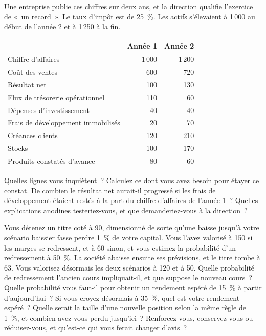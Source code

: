 \begin{question}\label{iq:iv2:valuation-and-financial-statements:24}
Une entreprise publie ces chiffres sur deux ans, et la direction qualifie l'exercice de «~un record~». Le taux d'impôt est de 25~\%. Les actifs s'élevaient à 1\,000 au début de l'année 2 et à 1\,250 à la fin.
\begin{center}\small
\begin{tabular}{@{}lrr@{}}
 & Année 1 & Année 2 \\ \hline
Chiffre d'affaires & 1\,000 & 1\,200 \\
Coût des ventes & 600 & 720 \\
Résultat net & 100 & 130 \\
Flux de trésorerie opérationnel & 110 & 60 \\
Dépenses d'investissement & 40 & 40 \\
Frais de développement immobilisés & 20 & 70 \\
Créances clients & 120 & 210 \\
Stocks & 100 & 170 \\
Produits constatés d'avance & 80 & 60
\end{tabular}
\end{center}
Quelles lignes vous inquiètent~? Calculez ce dont vous avez besoin pour étayer ce constat. De combien le résultat net aurait-il progressé si les frais de développement étaient restés à la part du chiffre d'affaires de l'année 1~? Quelles explications anodines testeriez-vous, et que demanderiez-vous à la direction~?
\end{question}

\begin{question}\label{iq:iv2:valuation-and-financial-statements:25}
Vous détenez un titre coté à 90, dimensionné de sorte qu'une baisse jusqu'à votre scénario baissier fasse perdre 1~\% de votre capital. Vous l'avez valorisé à 150 si les marges se redressent, et à 60 sinon, et vous estimez la probabilité d'un redressement à 50~\%. La société abaisse ensuite ses prévisions, et le titre tombe à 63. Vous valorisez désormais les deux scénarios à 120 et à 50. Quelle probabilité de redressement l'ancien cours impliquait-il, et que suppose le nouveau cours~? Quelle probabilité vous faut-il pour obtenir un rendement espéré de 15~\% à partir d'aujourd'hui~? Si vous croyez désormais à 35~\%, quel est votre rendement espéré~? Quelle serait la taille d'une nouvelle position selon la même règle de 1~\%, et combien avez-vous perdu jusqu'ici~? Renforcez-vous, conservez-vous ou réduisez-vous, et qu'est-ce qui vous ferait changer d'avis~?
\end{question}
